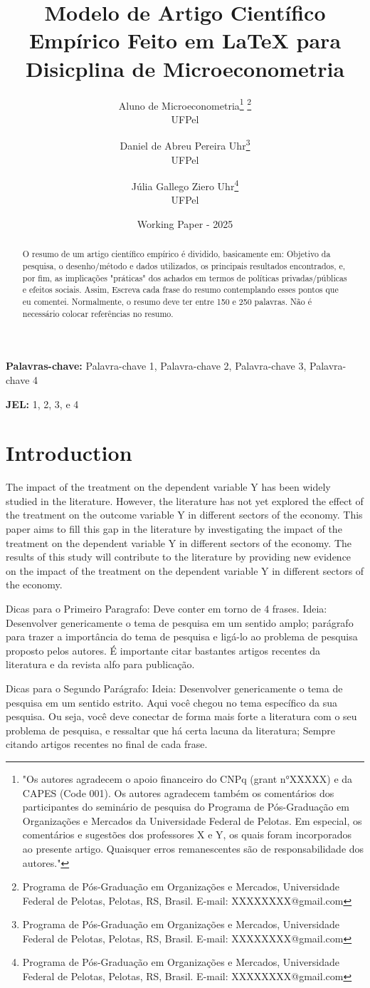 \documentclass[a4paper]{article}
\title{Modelo de Artigo Científico Empírico Feito em LaTeX para Disicplina de Microeconometria}
\author{Aluno de Microeconometria\footnote{"Os autores agradecem o apoio financeiro do CNPq (grant n°XXXXX) e da CAPES (Code 001). Os autores agradecem também os comentários dos participantes do seminário de pesquisa do Programa de Pós-Graduação em Organizações e Mercados da Universidade Federal de Pelotas. Em especial, os comentários e sugestões dos professores X e Y, os quais foram incorporados ao presente artigo. Quaisquer erros remanescentes são de responsabilidade dos autores."} \footnote{Programa de Pós-Graduação em Organizações e Mercados, Universidade Federal de Pelotas, Pelotas, RS, Brasil. E-mail: XXXXXXXX@gmail.com} \\ UFPel \and Daniel de Abreu Pereira Uhr\footnote{Programa de Pós-Graduação em Organizações e Mercados, Universidade Federal de Pelotas, Pelotas, RS, Brasil. E-mail: XXXXXXXX@gmail.com} \\ UFPel \and Júlia Gallego Ziero Uhr\footnote{Programa de Pós-Graduação em Organizações e Mercados, Universidade Federal de Pelotas, Pelotas, RS, Brasil. E-mail: XXXXXXXX@gmail.com} \\ UFPel}
\date{Working Paper - 2025}
\begin{document}
\maketitle 

\begin{abstract}
O resumo de um artigo científico empírico é dividido, basicamente em: Objetivo da pesquisa, o desenho/método e dados utilizados, os principais resultados encontrados, e, por fim, as implicações "práticas" dos achados em termos de políticas privadas/públicas e efeitos sociais. Assim, Escreva cada frase do resumo contemplando esses pontos que eu comentei. Normalmente, o resumo deve ter entre 150 e 250 palavras. Não é necessário colocar referências no resumo.
\end{abstract}

\textbf{Palavras-chave:} Palavra-chave 1, Palavra-chave 2, Palavra-chave 3, Palavra-chave 4

\textbf{JEL:}  1, 2, 3, e 4


\section{Introduction}

The impact of the treatment on the dependent variable Y has been widely studied in the literature. However, the literature has not yet explored the effect of the treatment on the outcome variable Y in different sectors of the economy. This paper aims to fill this gap in the literature by investigating the impact of the treatment on the dependent variable Y in different sectors of the economy. The results of this study will contribute to the literature by providing new evidence on the impact of the treatment on the dependent variable Y in different sectors of the economy.


Dicas para o Primeiro Paragrafo: Deve conter em torno de 4 frases. Ideia: Desenvolver genericamente o tema de pesquisa em um sentido amplo; parágrafo para trazer a importância do tema de pesquisa e ligá-lo ao problema de pesquisa proposto pelos autores. É importante citar bastantes artigos recentes da literatura e da revista alfo para publicação.

Dicas para o Segundo Parágrafo: Ideia: Desenvolver genericamente o tema de pesquisa em um sentido estrito. Aqui você chegou no tema específico da sua pesquisa. Ou seja, você deve conectar de forma mais forte a literatura com o seu problema de pesquisa, e ressaltar que há certa lacuna da literatura; Sempre citando artigos recentes no final de cada frase.
\end{document}
